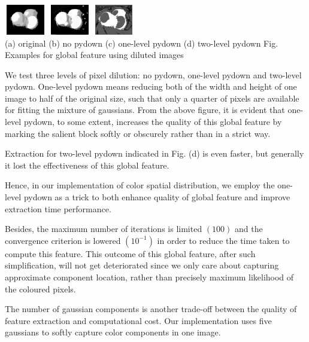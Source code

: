 \documentclass[10pt,twocolumn,letterpaper]{article}
\begin{document}
\begin{center}
    \includegraphics[width=0.72in,height=0.52in]{./Figures/pydownCompare/3NOPYDOWN.jpg}
    \includegraphics[width=0.72in,height=0.52in]{./Figures/pydownCompare/3PYDOWN.jpg} 
    \includegraphics[width=0.72in,height=0.52in]{./Figures/pydownCompare/3DOUBLEPYDOWN.jpg} \\
    \footnotesize (a) original (b) no pydown (c) one-level pydown (d) two-level pydown
    Fig. Examples for global feature using diluted images \\
    \end{center}

We test three levels of pixel dilution: no pydown, one-level pydown and two-level pydown. One-level pydown means reducing both of the width and height of one image to half of the original size,  such that only a quarter of pixels are available for fitting the mixture of gaussians. From the above figure, it is evident that one-level pydown, to some extent, increases the quality of  this global feature by marking the salient block softly or obscurely rather than in a strict way. 

Extraction for two-level pydown indicated in Fig. (d) is even faster, but generally it lost the effectiveness of this global feature.

Hence, in our implementation of color spatial distribution, we employ the one-level pydown as a trick to both enhance quality of global feature and improve extraction time performance.

Besides, the maximum number of iterations is limited $(100)$ and the convergence criterion is lowered $(10^{-1})$ in order to reduce the time taken to compute this feature.  This outcome of this global feature, after such simplification, will not get deteriorated since we only care about capturing  approximate component location, rather than precisely maximum likelihood of the coloured pixels.

The number of gaussian components is another trade-off between the quality of feature extraction and computational cost. Our implementation uses five gaussians to softly capture color components in one image. 
\end{document}
